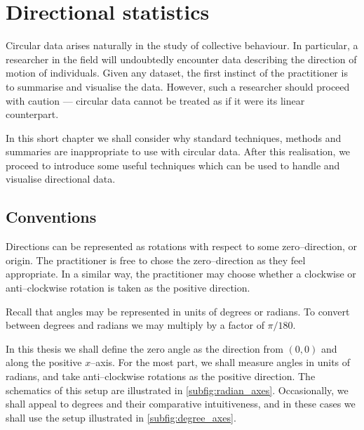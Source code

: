 \graphicspath{{fig/circ_stats_intro/}}

\chapter{Directional statistics}	
\label{cha:direct_stats}


Circular data arises naturally in the study of collective behaviour. In particular, a researcher in the field will undoubtedly encounter data describing the direction of motion of individuals. Given any dataset, the first instinct of the practitioner is to summarise and visualise the data. However, such a researcher should proceed with caution --- circular data cannot be treated as if it were its linear counterpart.

In this short chapter we shall consider why standard techniques, methods and summaries are inappropriate to use with circular data. After this realisation, we proceed to introduce some useful techniques which can be used to handle and visualise directional data.

\section{Conventions}
\label{sec:conventions}

Directions can be represented as rotations with respect to some zero--direction, or origin. The practitioner is free to chose the zero--direction as they feel appropriate. In a similar way, the practitioner may choose whether a clockwise or anti--clockwise rotation is taken as the positive direction.

Recall that angles may be represented in units of degrees or radians. To convert between degrees and radians we may multiply by a factor of $\pi/180$\textdegree.

In this thesis we shall define the zero angle as the direction from $(0, 0)$ and along the positive $x$--axis. For the most part, we shall measure angles in units of radians, and take anti--clockwise rotations as the positive direction. The schematics of this setup are illustrated in \cref{subfig:radian_axes}. Occasionally, we shall appeal to degrees and their comparative intuitiveness, and in these cases we shall use the setup illustrated in  \cref{subfig:degree_axes}.

